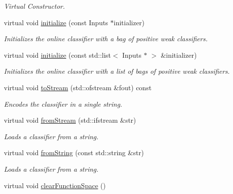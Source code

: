 \begin{DoxyCompactItemize}
\begin{DoxyCompactList}\small\item\em Virtual Constructor. \end{DoxyCompactList}\item 
virtual void \hyperlink{classiCub_1_1boostMIL_1_1OnlineBoost_afdeb1621efc90c5701f190404aa9b4c4}{initialize} (const Inputs $\ast$initializer)
\begin{DoxyCompactList}\small\item\em Initializes the online classifier with a bag of positive weak classifiers. \end{DoxyCompactList}\item 
virtual void \hyperlink{classiCub_1_1boostMIL_1_1OnlineBoost_a92965b42f03b4d597d8fad1639c147c8}{initialize} (const std\+::list$<$ Inputs $\ast$ $>$ \&initializer)
\begin{DoxyCompactList}\small\item\em Initializes the online classifier with a list of bags of positive weak classifiers. \end{DoxyCompactList}\item 
virtual void \hyperlink{classiCub_1_1boostMIL_1_1OnlineBoost_a873e5570c055fa6ca09e0ef23b034945}{to\+Stream} (std\+::ofstream \&fout) const 
\begin{DoxyCompactList}\small\item\em Encodes the classifier in a single string. \end{DoxyCompactList}\item 
virtual void \hyperlink{classiCub_1_1boostMIL_1_1OnlineBoost_a4258aee4c77ab8633765167389c30fbb}{from\+Stream} (std\+::ifstream \&str)
\begin{DoxyCompactList}\small\item\em Loads a classifier from a string. \end{DoxyCompactList}\item 
virtual void \hyperlink{classiCub_1_1boostMIL_1_1OnlineBoost_a3c72a282cb86a650eac248f03064bea5}{from\+String} (const std\+::string \&str)
\begin{DoxyCompactList}\small\item\em Loads a classifier from a string. \end{DoxyCompactList}\item 
virtual void \hyperlink{classiCub_1_1boostMIL_1_1OnlineBoost_a469d7d76a9cf53974b8b8b8c4b89e610}{clear\+Function\+Space} ()\label{classiCub_1_1boostMIL_1_1OnlineBoost_a469d7d76a9cf53974b8b8b8c4b89e610}


\end{DoxyCompactItemize}
